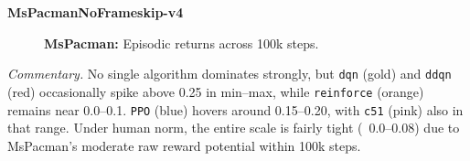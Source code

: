 \noindent
\textbf{MsPacmanNoFrameskip-v4}
\begin{figure} 
	\centering
	\quad
	\caption{\textbf{MsPacman:} Episodic returns across 100k steps.}
	\label{fig:mspacman_comparison_combined}
\end{figure}

\noindent
\emph{Commentary.}
No single algorithm dominates strongly, but \texttt{dqn} (gold) and \texttt{ddqn} (red) 
occasionally spike above 0.25 in min--max, while \texttt{reinforce} (orange) remains 
near 0.0--0.1. \texttt{PPO} (blue) hovers around 0.15--0.20, 
with \texttt{c51} (pink) also in that range. 
Under human norm, the entire scale is fairly tight (~0.0--0.08) 
due to MsPacman’s moderate raw reward potential within 100k steps.

\bigskip

